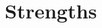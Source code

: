 \documentclass[11pt,a4paper,sans]{moderncv}
\begin{document}
\makecvtitle


\section{Strengths} %

\end{document}
